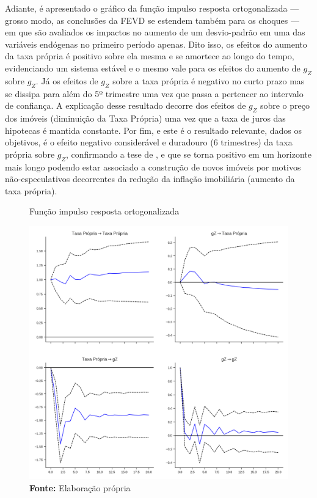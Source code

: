 Adiante, é apresentado o gráfico da função impulso resposta ortogonalizada --- grosso modo, as conclusões da FEVD se estendem também para os choques --- em que são avaliados os impactos no aumento de um desvio-padrão em uma das variáveis endógenas no primeiro período apenas. 
Dito isso, os efeitos do aumento da taxa própria é positivo sobre ela mesma e se amortece ao longo do tempo, evidenciando um sistema estável e o mesmo vale para os efeitos do aumento de $g_Z$ sobre $g_Z$. Já os efeitos de $g_Z$ sobre a taxa própria é negativo no curto prazo mas se dissipa para além do 5º trimestre uma vez que passa a pertencer ao intervalo de confiança. A explicação desse resultado decorre dos efeitos de $g_Z$ sobre o preço dos imóveis (diminuição da Taxa Própria) uma vez que a taxa de juros das hipotecas é mantida constante. Por fim, e este é o resultado relevante, dados os objetivos, é o efeito negativo considerável e duradouro (6 trimestres) da taxa própria sobre $g_Z$, confirmando a tese de \textcite{teixeira_crescimento_2015}, e que se torna positivo em um horizonte mais longo podendo estar associado a construção de novos imóveis por motivos não-especulativos decorrentes da redução da inflação imobiliária (aumento da taxa própria).


\begin{figure}[H]
	\centering
	\caption{Função impulso resposta ortogonalizada}
	\label{fevd}
	\includegraphics[width=\textwidth]{../../Modelo/SeriesTemporais/figs/Impulso_VECM.png}
	\caption*{\textbf{Fonte:} Elaboração própria}
\end{figure}

